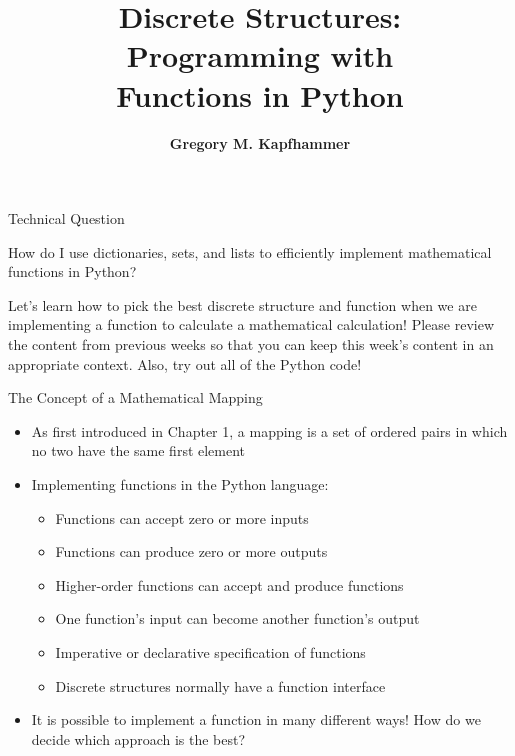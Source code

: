 \documentclass[14pt,aspectratio=169]{beamer}
\title{Discrete Structures: \\ Programming with \\ Functions in Python}
\author{{\bf Gregory M. Kapfhammer}}
\institute[shortinst]{{\bf Department of Computer Science, Allegheny College}}
\begin{document}
{
  \begin{frame}
    \titlepage
  \end{frame}
}

%
\begin{frame}{Technical Question}
  \hspace*{.5in}
  \begin{minipage}{4.3in}
    \vspace*{.1in}
    \begin{center}
      {\large How do I use dictionaries, sets, and lists to efficiently
      implement mathematical functions in Python?}
    \end{center}
  \end{minipage}
  \vspace{2ex}
  \begin{center}
    \small Let's learn how to pick the best discrete structure and function when
    we are implementing a function to calculate a mathematical calculation!
    Please review the content from previous weeks so that you can keep this
    week's content in an appropriate context. Also, try out all of the Python
    code!
  \end{center}
\end{frame}

%
\begin{frame}{The Concept of a Mathematical Mapping}
  \begin{itemize}
    \item As first introduced in Chapter 1, a mapping is a set of ordered pairs
      in which no two have the same first element
      \vspace*{-.15in}
    \item Implementing functions in the Python language:
      \begin{itemize}
        \item Functions can accept zero or more inputs
        \item Functions can produce zero or more outputs
        \item Higher-order functions can accept and produce functions
        \item One function's input can become another function's output
        \item Imperative or declarative specification of functions
        \item Discrete structures normally have a function interface
      \end{itemize}
      \vspace*{-.2in}
    \item It is possible to implement a function in many different ways! How do
      we decide which approach is the best?
  \end{itemize}
\end{frame}
\end{document}
